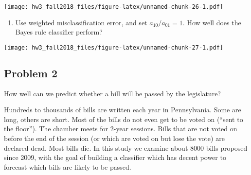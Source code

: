 \documentclass[]{article}
\newenvironment{Shaded}{\begin{snugshade}}{\end{snugshade}}
\newcommand{\KeywordTok}[1]{\textcolor[rgb]{0.13,0.29,0.53}{\textbf{#1}}}
\newcommand{\DataTypeTok}[1]{\textcolor[rgb]{0.13,0.29,0.53}{#1}}
\newcommand{\DecValTok}[1]{\textcolor[rgb]{0.00,0.00,0.81}{#1}}
\newcommand{\FloatTok}[1]{\textcolor[rgb]{0.00,0.00,0.81}{#1}}
\newcommand{\StringTok}[1]{\textcolor[rgb]{0.31,0.60,0.02}{#1}}
\newcommand{\OperatorTok}[1]{\textcolor[rgb]{0.81,0.36,0.00}{\textbf{#1}}}
\newcommand{\NormalTok}[1]{#1}
\providecommand{\tightlist}{%
  \setlength{\itemsep}{0pt}\setlength{\parskip}{0pt}}
\begin{document}
\texttt{[image: hw3\_fall2018\_files/figure-latex/unnamed-chunk-26-1.pdf]}

\begin{enumerate}
\def\labelenumi{\alph{enumi}.}
\setcounter{enumi}{4}
\tightlist
\item
  Use weighted misclassification error, and set \(a_{10}/a_{01}=1\). How
  well does the Bayes rule classifier perform?
\end{enumerate}

\begin{Shaded}
\end{Shaded}

\texttt{[image: hw3\_fall2018\_files/figure-latex/unnamed-chunk-27-1.pdf]}

\subsection{Problem 2}\label{problem-2}

How well can we predict whether a bill will be passed by the
legislature?

Hundreds to thousands of bills are written each year in Pennsylvania.
Some are long, others are short. Most of the bills do not even get to be
voted on (``sent to the floor''). The chamber meets for 2-year sessions.
Bills that are not voted on before the end of the session (or which are
voted on but lose the vote) are declared dead. Most bills die. In this
study we examine about 8000 bills proposed since 2009, with the goal of
building a classifier which has decent power to forecast which bills are
likely to be passed.
\end{document}

